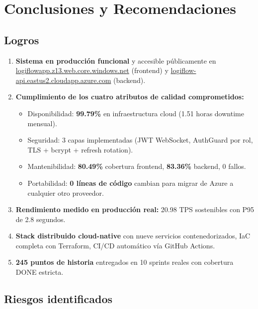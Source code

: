 \documentclass[12pt,a4paper,oneside]{article}
\newcommand{\liveweb}{\href{https://logiflowapp.z13.web.core.windows.net}{logiflowapp.z13.web.core.windows.net}}
\newcommand{\liveapi}{\href{https://logiflow-api.eastus2.cloudapp.azure.com}{logiflow-api.eastus2.cloudapp.azure.com}}
\begin{document}
\section{Conclusiones y Recomendaciones}

\subsection{Logros}

\begin{enumerate}[leftmargin=*]
  \item \textbf{Sistema en producci\'on funcional} y accesible p\'ublicamente en \liveweb{} (frontend) y \liveapi{} (backend).
  \item \textbf{Cumplimiento de los cuatro atributos de calidad comprometidos:}
  \begin{itemize}
    \item Disponibilidad: \textbf{99.79\%} en infraestructura cloud (1.51 horas downtime mensual).
    \item Seguridad: 3 capas implementadas (JWT WebSocket, AuthGuard por rol, TLS + bcrypt + refresh rotation).
    \item Mantenibilidad: \textbf{80.49\%} cobertura frontend, \textbf{83.36\%} backend, 0 fallos.
    \item Portabilidad: \textbf{0 l\'ineas de c\'odigo} cambian para migrar de Azure a cualquier otro proveedor.
  \end{itemize}
  \item \textbf{Rendimiento medido en producci\'on real:} 20.98 TPS sostenibles con P95 de 2.8 segundos.
  \item \textbf{Stack distribuido cloud-native} con nueve servicios contenedorizados, IaC completa con Terraform, CI/CD autom\'atico v\'ia GitHub Actions.
  \item \textbf{245 puntos de historia} entregados en 10 sprints reales con cobertura DONE estricta.
\end{enumerate}

\subsection{Riesgos identificados}
\end{document}
